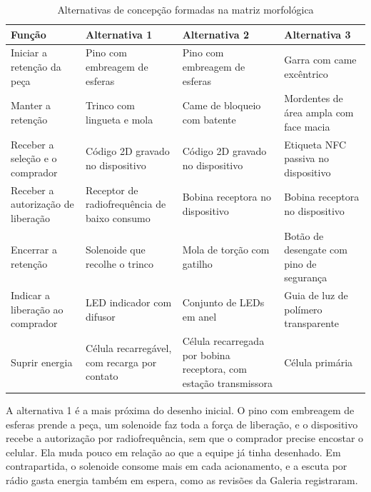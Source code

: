 \begin{table}[htbp]
    \centering
    \caption{Alternativas de concepção formadas na matriz morfológica}
    \label{tab:reform_alternativas}
    \footnotesize
    \renewcommand{\arraystretch}{1.3}
    \begin{tabularx}{\textwidth}{@{}
        >{\RaggedRight\arraybackslash}p{3.3cm}
        >{\RaggedRight\arraybackslash}X
        >{\RaggedRight\arraybackslash}X
        >{\RaggedRight\arraybackslash}X@{}}
        \toprule
        \textbf{Função} & \textbf{Alternativa 1} & \textbf{Alternativa 2} & \textbf{Alternativa 3} \\
        \midrule
        Iniciar a retenção da peça & Pino com embreagem de esferas & Pino com embreagem de esferas & Garra com came excêntrico \\
        Manter a retenção & Trinco com lingueta e mola & Came de bloqueio com batente & Mordentes de área ampla com face macia \\
        Receber a seleção e o comprador & Código 2D gravado no dispositivo & Código 2D gravado no dispositivo & Etiqueta NFC passiva no dispositivo \\
        Receber a autorização de liberação & Receptor de radiofrequência de baixo consumo & Bobina receptora no dispositivo & Bobina receptora no dispositivo \\
        Encerrar a retenção & Solenoide que recolhe o trinco & Mola de torção com gatilho & Botão de desengate com pino de segurança \\
        Indicar a liberação ao comprador & LED indicador com difusor & Conjunto de LEDs em anel & Guia de luz de polímero transparente \\
        Suprir energia & Célula recarregável, com recarga por contato & Célula recarregada por bobina receptora, com estação transmissora & Célula primária \\
        \bottomrule
    \end{tabularx}
\end{table}

A alternativa 1 é a mais próxima do desenho inicial. O pino com embreagem de esferas prende a peça, um solenoide faz toda a força de liberação, e o dispositivo recebe a autorização por radiofrequência, sem que o comprador precise encostar o celular. Ela muda pouco em relação ao que a equipe já tinha desenhado. Em contrapartida, o solenoide consome mais em cada acionamento, e a escuta por rádio gasta energia também em espera, como as revisões da Galeria registraram.

